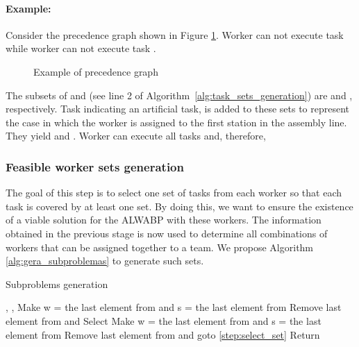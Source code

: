 \documentclass{singlecol-new}
\begin{document}
\paragraph{Example:} Consider the precedence graph shown in Figure \ref{fig:ex_grafo}. Worker   can not execute task  while worker  can not execute task .

\begin{figure}[!ht]
\centering
{}
\caption{Example of precedence graph}
\label{fig:ex_grafo}
\end{figure}



The subsets of  and  (see line 2 of Algorithm~\ref{alg:task_sets_generation})  are  and , respectively. Task  indicating an artificial task, is added to these sets to represent the case in which the worker is assigned to the first station in the assembly line. They yield  and  . Worker  can execute all tasks and, therefore, 

\subsubsection{Feasible worker sets generation}

The goal of this step is to select one set of tasks from each worker so that each task is covered by at least one set. By doing this, we want to ensure the existence of a viable solution for the ALWABP with these workers. The information obtained in the previous stage is now used to determine all combinations of workers that can be assigned together to a team. We propose Algorithm \ref{alg:gera_subproblemas} to generate such sets.

\begin{algorithm}[!ht]
\caption{Subproblems generation}
\label{alg:gera_subproblemas}
\begin{algorithmic}[1]
\REQUIRE 
\STATE , , 
\STATE \label{step:artificial_task}
\FORALL{}
	\FORALL{}\label{step:select_set}
		\STATE  \label{step:add_set}
		\STATE  \label{step:add_worker}
		\IF{}
			\STATE  \label{step:add_subproblem}
			\STATE Make w = the last element from  and s = the last element from 
			\STATE Remove last element from  and \label{step:remove_worker}
		\ELSE
			\STATE Select \label{step:select_task}
		\ENDIF
	\ENDFOR
\ENDFOR
\IF{}
	\STATE Make w = the last element from  and s = the last element from 
	\STATE Remove last element from  and  \label{step:remove_last}
	\STATE goto \ref{step:select_set}
\ELSE
	\STATE Return \label{step:gera_subp_fim}
\ENDIF
\end{algorithmic}
\end{algorithm}
\end{document}
